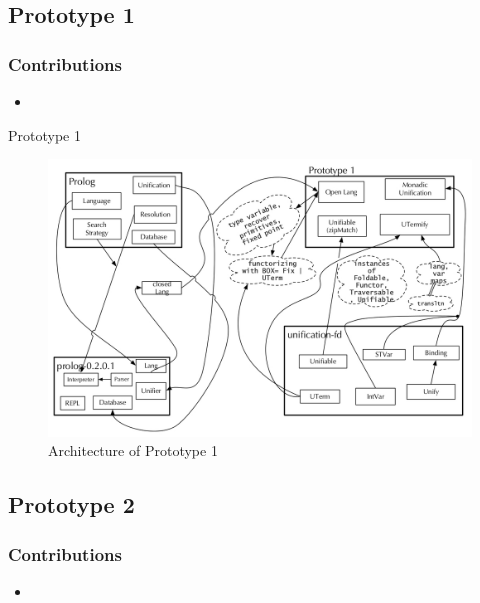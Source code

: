 \documentclass[hideothersubsections]{beamer}
\begin{document}
\subsection{Prototype 1}
\begin{frame}
\frametitle{Contributions}
\begin{itemize}
\item
\end{itemize}
\end{frame}

\begin{frame}{Prototype 1}
\begin{figure}[H]
  \includegraphics[width=1\textwidth]{Prototype-1-architecture.jpeg}
  \caption{Architecture of Prototype 1}
  \label{fig:proto1-arch}
\end{figure}
\end{frame}


\subsection{Prototype 2}

\begin{frame}
\frametitle{Contributions}
\begin{itemize}
\item
\end{itemize}
\end{frame}
\end{document}
